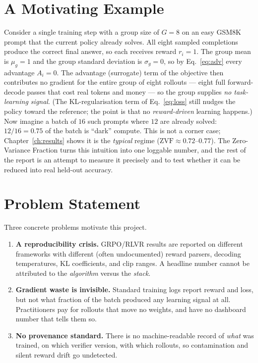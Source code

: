 \documentclass[12pt,a4paper]{report}
\newcommand{\zvf}{\mathrm{ZVF}}
\begin{document}
\section{A Motivating Example}
Consider a single training step with a group size of $G=8$ on an easy GSM8K prompt
that the current policy already solves. All eight sampled completions produce the
correct final answer, so each receives reward $r_i=1$. The group mean is $\mu_g=1$
and the group standard deviation is $\sigma_g=0$, so by Eq.~\eqref{eq:adv} every
advantage $A_i=0$. The advantage (surrogate) term of the objective then contributes
no gradient for the entire group of eight rollouts --- eight full forward-decode
passes that cost real tokens and money --- so the group supplies \emph{no
task-learning signal}. (The KL-regularisation term of Eq.~\eqref{eq:loss} still nudges
the policy toward the reference; the point is that no \emph{reward-driven} learning
happens.)
Now imagine a batch of $16$ such prompts where $12$ are already solved: $12/16=0.75$
of the batch is ``dark'' compute. This is not a corner case; Chapter~\ref{ch:results}
shows it is the \emph{typical} regime ($\zvf\approx0.72$--$0.77$). The Zero-Variance
Fraction turns this intuition into one loggable number, and the rest of the report is
an attempt to measure it precisely and to test whether it can be reduced into real
held-out accuracy.

\section{Problem Statement}
Three concrete problems motivate this project.
\begin{enumerate}[leftmargin=1.6em,itemsep=3pt]
  \item \textbf{A reproducibility crisis.} GRPO/RLVR results are reported on
  different frameworks with different (often undocumented) reward parsers, decoding
  temperatures, KL coefficients, and clip ranges. A headline number cannot be
  attributed to the \emph{algorithm} versus the \emph{stack}.
  \item \textbf{Gradient waste is invisible.} Standard training logs report reward
  and loss, but not what fraction of the batch produced any learning signal at all.
  Practitioners pay for rollouts that move no weights, and have no dashboard number
  that tells them so.
  \item \textbf{No provenance standard.} There is no machine-readable record of
  \emph{what} was trained, on which verifier version, with which rollouts, so
  contamination and silent reward drift go undetected.
\end{enumerate}
\end{document}
